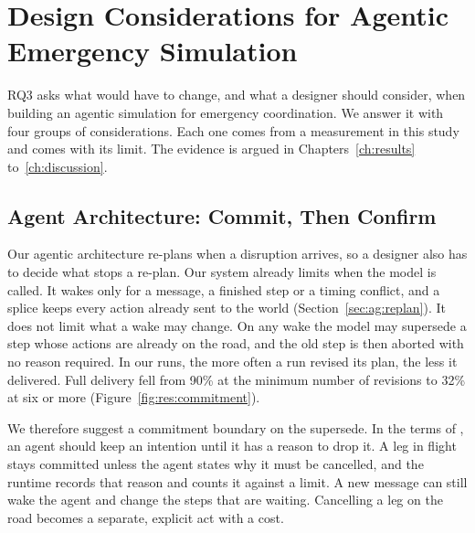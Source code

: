 \chapter{Design Considerations for Agentic Emergency Simulation}
\label{ch:design}


RQ3 asks what would have to change, and what a designer should consider, when
building an agentic simulation for emergency coordination. We answer it with
four groups of considerations. Each one comes from a measurement in this study
and comes with its limit. The evidence is argued in
Chapters~\ref{ch:results} to~\ref{ch:discussion}.

\section{Agent Architecture: Commit, Then Confirm}
\label{sec:design:commitment}
\label{sec:design:closure}

Our agentic architecture re-plans when a disruption arrives, so a designer
also has to decide what stops a re-plan. Our system already limits when the model is called. It wakes
only for a message, a finished step or a timing conflict, and a splice keeps
every action already sent to the world (Section~\ref{sec:ag:replan}). It does
not limit what a wake may change. On any wake the model may supersede a step
whose actions are already on the road, and the old step is then aborted with
no reason required. In our runs, the more often a run revised its plan, the
less it delivered. Full delivery fell from 90\% at the minimum number of
revisions to 32\% at six or more (Figure~\ref{fig:res:commitment}).

We therefore suggest a commitment boundary on the supersede. In the terms of
\textcite{cohen1990}, an agent should keep an intention until it has a reason
to drop it. A leg in flight stays committed unless the agent states why it
must be cancelled, and the runtime records that reason and counts it against a
limit. A new message can still wake the agent and change the steps that are
waiting. Cancelling a leg on the road becomes a separate, explicit act with a
cost.

